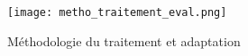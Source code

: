 ﻿{\color{red}
\par 
\label{metho_adaptation}
\begin{figure}[H]
    \centering
    \texttt{[image: metho\_traitement\_eval.png]}
    \caption{Méthodologie du traitement et adaptation}
    \label{fig:metho_adaptation}
\end{figure}

\vspace{1\baselineskip}
}